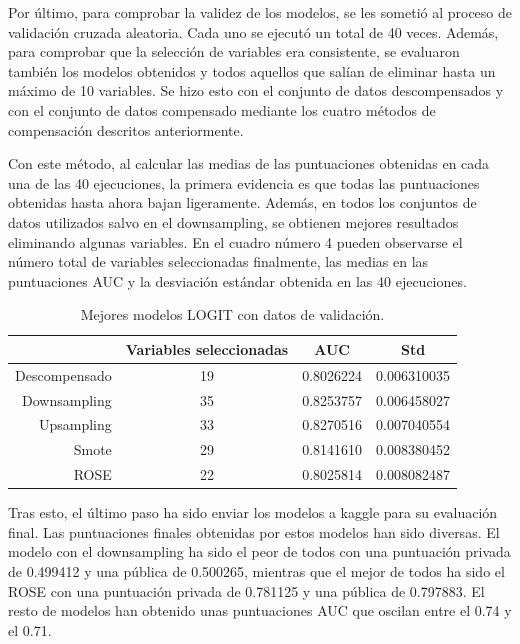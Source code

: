 \documentclass[11pt,a4paper,spanish]{article} %
\begin{document}
Por último, para comprobar la validez de los modelos, se les sometió al proceso de validación cruzada aleatoria. Cada uno se ejecutó un total de 40 veces. Además, para comprobar que la selección de variables era consistente, se evaluaron también los modelos obtenidos y todos aquellos que salían de eliminar hasta un máximo de 10 variables. Se hizo esto con el conjunto de datos descompensados y con el conjunto de datos compensado mediante los cuatro métodos de compensación descritos anteriormente. 

Con este método, al calcular las medias de las puntuaciones obtenidas en cada una de las 40 ejecuciones, la primera evidencia es que todas las puntuaciones obtenidas hasta ahora bajan ligeramente. Además, en todos los conjuntos de datos utilizados salvo en el downsampling, se obtienen mejores resultados eliminando algunas variables. En el cuadro número 4 pueden observarse el número total de variables seleccionadas finalmente, las medias en las puntuaciones AUC y la desviación estándar obtenida en las 40 ejecuciones. 


\begin{table}[!htbp]
\begin{center}
\begin{tabular}{rccc}
  \hline
& Variables seleccionadas & AUC & Std \\ 
  \hline
Descompensado &  19 & 0.8026224 & 0.006310035 \\ 
Downsampling &  35 & 0.8253757 & 0.006458027 \\ 
Upsampling &  33 & 0.8270516 & 0.007040554 \\ 
Smote &  29 & 0.8141610 & 0.008380452 \\ 
ROSE &  22 & 0.8025814 & 0.008082487\\ 
   \hline
\end{tabular}
\end{center}
\caption{Mejores modelos LOGIT con datos de validación.}
\end{table}

Tras esto, el último paso ha sido enviar los modelos a kaggle para su evaluación final. Las puntuaciones finales obtenidas por estos modelos han sido diversas. El modelo con el downsampling ha sido el peor de todos con una puntuación privada de 0.499412 y una pública de 0.500265, mientras que el mejor de todos ha sido el ROSE con una puntuación privada de 0.781125 y una pública de 0.797883. El resto de modelos han obtenido unas puntuaciones AUC que oscilan entre el 0.74 y el 0.71. 
\end{document}
